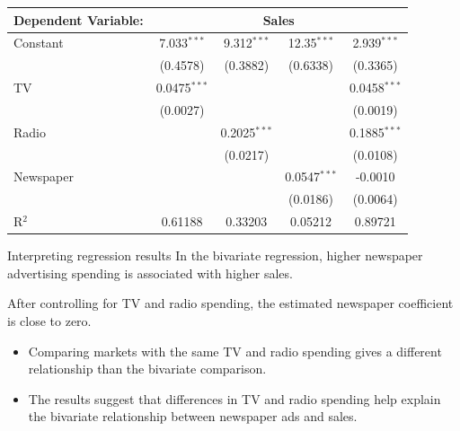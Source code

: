 \documentclass[aspectratio=169,t,11pt,table]{beamer}
\begin{document}
\begin{frame}{}{}
  \bigskip
  \begin{center}
    \small
    \begin{tabular}{lcccc}
      \toprule
      Dependent Variable: & \multicolumn{4}{c}{Sales}\\
      \midrule
      Constant     & 7.033$^{***}$  & 9.312$^{***}$  & 12.35$^{***}$  & 2.939$^{***}$\\   
                    & (0.4578)       & (0.3882)       & (0.6338)       & (0.3365)\\   
      TV           & 0.0475$^{***}$ &                &                & 0.0458$^{***}$\\   
                    & (0.0027)       &                &                & (0.0019)\\   
      Radio        &                & 0.2025$^{***}$ &                & 0.1885$^{***}$\\   
                    &                & (0.0217)       &                & (0.0108)\\   
      Newspaper    &                &                & 0.0547$^{***}$ & -0.0010\\   
                    &                &                & (0.0186)       & (0.0064)\\   
      \midrule
      R$^2$        & 0.61188        & 0.33203        & 0.05212        & 0.89721\\  
      \bottomrule
    \end{tabular}
  \end{center}
\end{frame}

\begin{frame}{Interpreting regression results}
  In the bivariate regression, higher newspaper advertising spending is associated with higher sales.

  \bigskip
  After controlling for TV and radio spending, the estimated newspaper coefficient is close to zero.
  \begin{itemize}
    \item Comparing markets with the same TV and radio spending gives a different relationship than the bivariate comparison.
    \item The results suggest that differences in TV and radio spending help explain the bivariate relationship between newspaper ads and sales.
  \end{itemize}
\end{frame}
\end{document}
